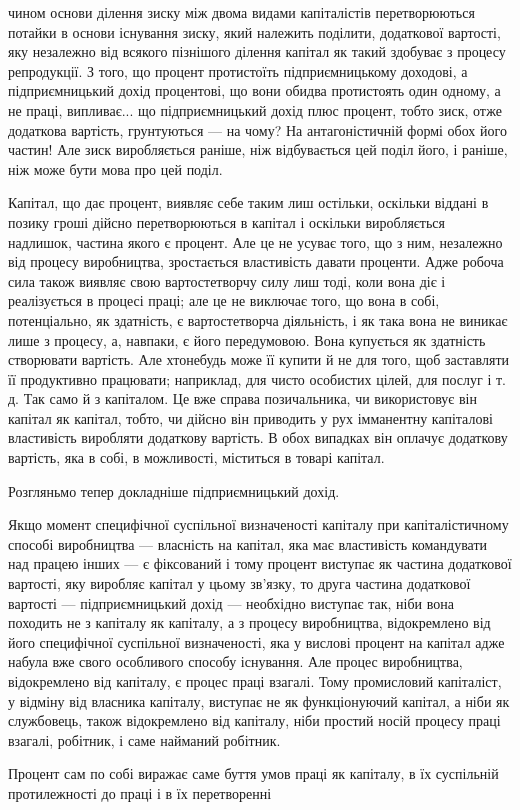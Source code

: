 \parcont{}  %
чином основи ділення зиску між двома видами капіталістів перетворюються
потайки в основи існування зиску, який належить
поділити, додаткової вартості, яку незалежно від всякого пізнішого
ділення капітал як такий здобуває з процесу репродукції.
З того, що процент протистоїть підприємницькому доходові, а
підприємницький дохід процентові, що вони обидва протистоять
один одному, а не праці, випливає... що підприємницький дохід
плюс процент, тобто зиск, отже додаткова вартість, грунтуються
— на чому? На антагоністичній формі обох його частин!
Але зиск виробляється раніше, ніж відбувається цей поділ його,
і раніше, ніж може бути мова про цей поділ.

Капітал, що дає процент, виявляє себе таким лиш остільки,
оскільки віддані в позику гроші дійсно перетворюються в капітал
і оскільки виробляється надлишок, частина якого є процент.
Але це не усуває того, що з ним, незалежно від процесу виробництва,
зростається властивість давати проценти. Адже робоча
сила також виявляє свою вартостетворчу силу лиш тоді, коли
вона діє і реалізується в процесі праці; але це не виключає того,
що вона в собі, потенціально, як здатність, є вартостетворча
діяльність, і як така вона не виникає лише з процесу, а, навпаки,
є його передумовою. Вона купується як здатність створювати
вартість. Але хтонебудь може її купити й не для того, щоб заставляти
її продуктивно працювати; наприклад, для чисто особистих
цілей, для послуг і т. д. Так само й з капіталом. Це вже справа
позичальника, чи використовує він капітал як капітал, тобто,
чи дійсно він приводить у рух імманентну капіталові властивість
виробляти додаткову вартість. В обох випадках він оплачує
додаткову вартість, яка в собі, в можливості, міститься в товарі
капітал.

Розгляньмо тепер докладніше підприємницький дохід.

Якщо момент специфічної суспільної визначеності капіталу
при капіталістичному способі виробництва — власність на капітал,
яка має властивість командувати над працею інших — є фіксований
і тому процент виступає як частина додаткової вартості, яку
виробляє капітал у цьому зв’язку, то друга частина додаткової
вартості — підприємницький дохід — необхідно виступає так, ніби
вона походить не з капіталу як капіталу, а з процесу виробництва,
відокремлено від його специфічної суспільної визначеності,
яка у вислові процент на капітал адже набула вже
свого особливого способу існування. Але процес виробництва,
відокремлено від капіталу, є процес праці взагалі. Тому промисловий
капіталіст, у відміну від власника капіталу, виступає не
як функціонуючий капітал, а ніби як службовець, також відокремлено
від капіталу, ніби простий носій процесу праці взагалі,
робітник, і саме найманий робітник.

Процент сам по собі виражає саме буття умов праці як капіталу,
в їх суспільній протилежності до праці і в їх перетворенні
\parbreak{}  %
